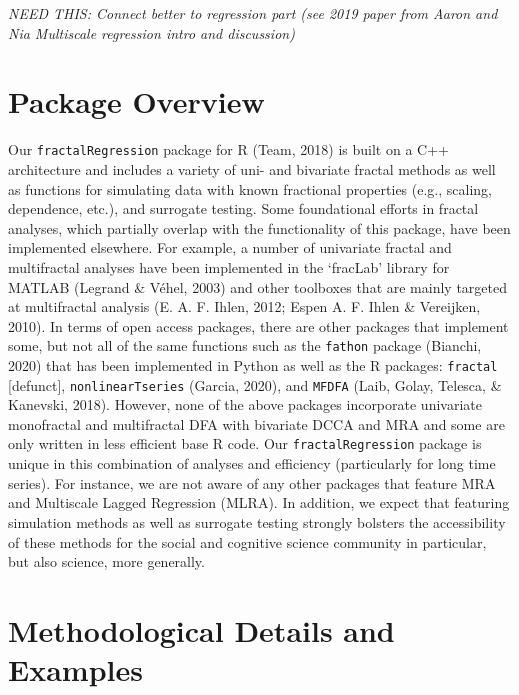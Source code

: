 \documentclass[
  man]{apa6}
\begin{document}
\emph{NEED THIS: Connect better to regression part (see 2019 paper from Aaron
and Nia Multiscale regression intro and discussion)}

\hypertarget{package-overview}{%
\section{Package Overview}\label{package-overview}}

Our \texttt{fractalRegression} package for R
(Team, 2018) is built on a C++
architecture and includes a variety of uni- and bivariate fractal
methods as well as functions for simulating data with known fractional
properties (e.g., scaling, dependence, etc.), and surrogate testing.
Some foundational efforts in fractal analyses, which partially overlap
with the functionality of this package, have been implemented elsewhere.
For example, a number of univariate fractal and multifractal analyses
have been implemented in the `fracLab' library for MATLAB (Legrand \& Véhel, 2003)
and other toolboxes that are mainly targeted at multifractal analysis
(E. A. F. Ihlen, 2012; Espen A. F. Ihlen \& Vereijken, 2010). In terms of
open access packages, there are other packages that implement some, but
not all of the same functions such as the \texttt{fathon} package
(Bianchi, 2020) that has been implemented in Python as well as the R
packages: \texttt{fractal} {[}defunct{]}, \texttt{nonlinearTseries}
(Garcia, 2020), and \texttt{MFDFA}
(Laib, Golay, Telesca, \& Kanevski, 2018). However, none of the above packages
incorporate univariate monofractal and multifractal DFA with bivariate
DCCA and MRA and some are only written in less efficient base R code.
Our \texttt{fractalRegression} package is unique in this combination of
analyses and efficiency (particularly for long time series). For
instance, we are not aware of any other packages that feature MRA and
Multiscale Lagged Regression (MLRA). In addition, we expect that
featuring simulation methods as well as surrogate testing strongly
bolsters the accessibility of these methods for the social and cognitive
science community in particular, but also science, more generally.

\hypertarget{methodological-details-and-examples}{%
\section{Methodological Details and Examples}\label{methodological-details-and-examples}}
\end{document}
